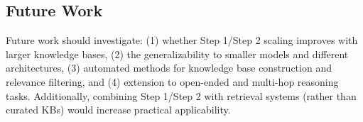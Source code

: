 \subsection{Future Work}

Future work should investigate: (1) whether Step 1/Step 2 scaling improves with larger knowledge bases, (2) the generalizability to smaller models and different architectures, (3) automated methods for knowledge base construction and relevance filtering, and (4) extension to open-ended and multi-hop reasoning tasks. Additionally, combining Step 1/Step 2 with retrieval systems (rather than curated KBs) would increase practical applicability.
